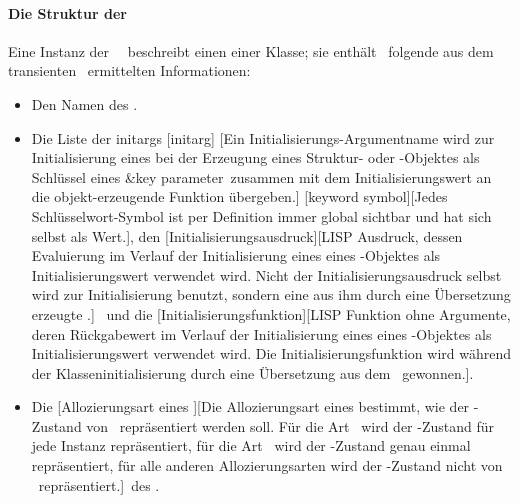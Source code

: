 \paragraph{Die Struktur der
\protect\sltdc\ \protect{}}
Eine Instanz der \sltdc\ \ beschreibt einen
\Slt\/ einer Klasse; sie enth\"{a}lt \ua\ folgende aus dem
transienten \sltmo\ ermittelten Informationen:
\begin{itemize}
%
\item Den Namen des \Slt[s].
%
\item Die Liste der %
{initargs}%
%
[initarg]%
[{Ein Initialisierungs-Argumentname wird zur Initialisierung eines
\protect\Slt[s]\/ bei der Erzeugung eines Struktur- oder
\protect\clos-Objektes als Schl\"{u}s\-sel eines
\protect{}%
{\protect\&key parameter}\ zusammen mit dem Initialisierungswert an
die ob\-jekt-er\-zeu\-gen\-de Funktion \"{u}bergeben.}]%
[keyword symbol][Jedes
Schl\"{u}sselwort-Symbol ist per Definition immer global sichtbar und hat
sich selbst als Wert.],
%
den %
%
[Initialisierungsausdruck][{LISP Ausdruck, dessen Evaluierung im
Verlauf der Initialisierung eines \protect\Slt[s]\/ eines
\protect\clos-Objektes als
Initialisierungswert verwendet wird. Nicht der
Initialisierungsausdruck selbst wird zur Initialisierung benutzt,
sondern eine aus ihm durch eine \"{U}bersetzung erzeugte
\protect{}%
{\protect{}}.}]\ %
%
und die %
%
[Initialisierungsfunktion][{LISP
Funktion ohne Ar\-gu\-men\-te, deren R\"{u}ck\-ga\-be\-wert im Verlauf
der Initialisierung eines \protect\Slt[s]\/ eines
\protect\clos-Objektes als Initialisierungswert verwendet wird. Die
Initialisierungsfunktion wird w\"{a}hrend der Klasseninitialisierung
durch eine \"{U}bersetzung aus dem
\protect{}%
{\protect{}}\ gewonnen.}].
%
\item Die [{Allozierungsart
eines \protect\Slt[s]}][{Die Allozierungsart eines
\protect\Slt[s]\/ bestimmt, wie der \protect\Slt\/-Zustand von
\protect\clos\ repr\"{a}sentiert werden soll. F\"{u}r die Art 
\protect{}\ wird der \protect\Slt\/-Zustand f\"{u}r
jede Instanz repr\"{a}sentiert, f\"{u}r die Art \protect{}\ wird
der \protect\Slt\/-Zustand genau einmal repr\"{a}sentiert, f\"{u}r alle
anderen Allozierungsarten wird der \protect\Slt\/-Zustand nicht von
\protect\clos\ repr\"{a}sentiert.}]\ des \Slt[s].
%
\end{itemize}
